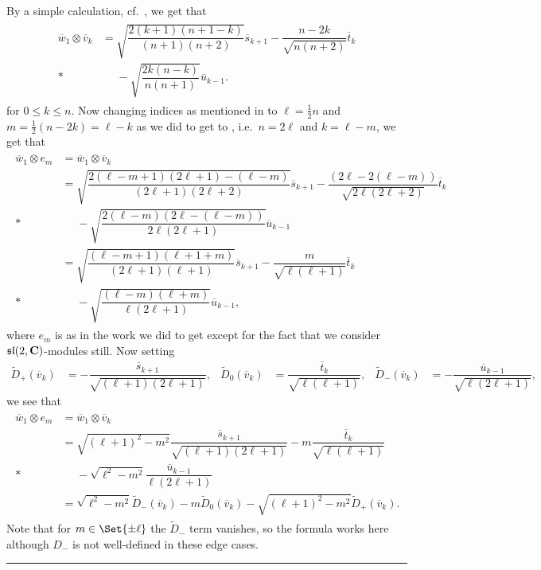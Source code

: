 By a simple calculation, cf.\ , we get that
\begin{align}\label{eq:barw_1tensorbarv_k}
  \begin{aligned}
    \overline w_1 \otimes \overline v_k &= \sqrt{\dfrac{2(k+1)(n+1-k)}{(n+1)(n+2)}}\overline s_{k+1} - \dfrac{n-2k}{\sqrt{n(n+2)}}\overline t_k \\*
    &\phantom{{}={}}{} - \sqrt{\dfrac{2k(n-k)}{n(n+1)}}\overline u_{k-1}.
  \end{aligned}
\end{align}
for $0\leq k\leq n$. Now changing indices as mentioned in  to $\ell = \tfrac{1}{2}n$ and $m=\tfrac{1}{2}(n-2k)=\ell-k$ as we did to get to , i.e.\ $n=2\ell$ and $k=\ell-m$, we get that
\begin{align*}
  \begin{aligned}
    \overline w_1\otimes e_m &= \overline w_1\otimes\overline v_k \\
    &= \sqrt{\dfrac{2(\ell-m+1)(2\ell+1)-(\ell-m)}{(2\ell+1)(2\ell+2)}}\overline s_{k+1} - \dfrac{(2\ell-2(\ell-m))}{\sqrt{2\ell(2\ell+2)}}\overline t_{k} \\*
    &\phantom{{}={}}{} - \sqrt{\dfrac{2(\ell-m)(2\ell-(\ell-m))}{2\ell(2\ell+1)}}\overline u_{k-1} \\
    &= \sqrt{\dfrac{(\ell-m+1)(\ell+1+m)}{(2\ell+1)(\ell+1)}}\overline s_{k+1} - \dfrac{m}{\sqrt{\ell(\ell+1)}}\overline t_{k} \\*
    &\phantom{{}={}}{} - \sqrt{\dfrac{(\ell-m)(\ell+m)}{\ell(2\ell+1)}}\overline u_{k-1},
  \end{aligned}
\end{align*}
where $e_m$ is as in the work we did to get  except for the fact that we consider $\mathfrak{sl}(2,\mathbf{C})$-modules still. Now setting
\begin{align*}
  \widetilde D_+(\overline v_k) &= -\dfrac{\overline s_{k+1}}{\sqrt{(\ell+1)(2\ell+1)}}, & \widetilde D_0(\overline v_k) &= \dfrac{\overline t_k}{\sqrt{\ell(\ell+1)}}, & \widetilde D_-(\overline v_k) &= -\dfrac{\overline u_{k-1}}{\sqrt{\ell(2\ell+1)}},
\end{align*}
we see that
\begin{align}\label{eq:Drelstilde}
  \begin{aligned}
    \overline w_1 \otimes e_m &= \overline w_1\otimes\overline v_k \\
    &=\sqrt{(\ell+1)^2-m^2}\dfrac{\overline s_{k+1}}{\sqrt{(\ell+1)(2\ell+1)}} - m\dfrac{\overline t_k}{\sqrt{\ell(\ell+1)}} \\*
    &\phantom{{}={}}{} - \sqrt{\ell^2-m^2}\dfrac{\overline u_{k-1}}{\ell(2\ell+1)} \\
    &= \sqrt{\ell^2-m^2}\widetilde D_-(\overline v_k) - m\widetilde D_0(\overline v_k) - \sqrt{(\ell+1)^2-m^2}\widetilde D_+(\overline v_k).
  \end{aligned}
\end{align}
Note that for $m\in\Set{\pm\ell}$ the $\widetilde D_-$ term vanishes, so the formula works here although $D_-$ is not well-defined in these edge cases.\fancybreak{* \quad * \quad * \quad * \quad *}

